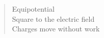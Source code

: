 \vspace*{\fill}
\begin{verse}
Equipotential\\
Square to the electric field\\
Charges move without work
\end{verse}
\vspace*{\fill}
